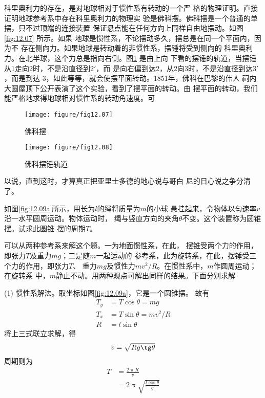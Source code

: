 \documentclass[../outline-of-mechanics.tex]{subfiles}
\begin{document}
科里奥利力的存在，是对地球相对于惯性系有转动的一个严
格的物理证明。直接证明地球参考系中存在科里奥利力的物理实
验是佛科摆。佛科摆是一个普通的单摆，只不过顶端的连接装置
保证悬点能在任何方向上同样自由地摆动。如图\ref{fig:12.07} 所示。如果
地球是惯性系，不论摆动多久，摆总是在同一个平面内，因为不
存在侧向力。如果地球是转动着的非惯性系，摆锤将受到侧向的
科里奥利力。在北半球，这个力总是指向右侧。图\ref{fig:12.08} 是由上向
下看的摆锤的轨道，当摆锤从1走向2时，不是沿直径到$ 2' $，而
是向右偏到达2，从2向3时，不是沿直径到达$ 3' $，而是到达
3，如此等等，就会使摆平面转动。1851年，佛科在巴黎的伟人
祠内大圆屋顶下公开表演了这个实验，看到了摆平面的转动。由
摆平面的转动，我们能严格地求得地球相对惯性系的转动角速度。可

\begin{figure}[h]
  \begin{minipage}[b]{0.5\linewidth}
    \centering
    \texttt{[image: figure/fig12.07]}
    \caption{佛科摆}
    \label{fig:12.07}
  \end{minipage}
  \begin{minipage}[b]{0.5\linewidth}
    \centering
    \texttt{[image: figure/fig12.08]}
    \caption{佛科摆锤轨道}
    \label{fig:12.08}
  \end{minipage}
\end{figure}%
\noindent
以说，直到这时，才算真正把亚里士多德的地心说与哥白
尼的日心说之争分清了。

\example 如图\ref{fig:12.09a}所示，用长为$ l $的绳将质量为$ m $的小球
悬挂起来，令物体以匀速率$ v $沿一水平圆周运动。物体运动时，
绳与竖直方向的夹角$ \theta $不变。这个装置称为圆锥摆。试求此圆锥
摆的周期$ T $。

\begin{figure}[h]
  \centering
  \qquad
  \caption{}
  \label{fig:12.09}
\end{figure}

\solution 可以从两种参考系来解这个题。一为地面惯性系，在此，
摆锥受两个力的作用，即张力$ T $及重力$ mg $；二是随$ m $一起运动的
参考系，此为旋转系，在此，摆锤受三个力的作用，即张力$ T $、
重力$ mg $及惯性力$ mv^2/R $。在惯性系中，$ m $作圆周运动；在旋转系
中，$ m $静止不动。用两种观点可解出同样的结果。下面分别求解

(1) 惯性系解法。取坐标如图\ref{fig:12.09a}，它是一个圆锥摆。
故有
\begin{align*}
  T _ { y } & = T \cos \theta = m g             \\
  T _ { x } & = T \sin \theta = m v ^ { 2 } / R \\
  R         & = l \sin \theta
\end{align*}
将上三式联立求解，得
\begin{equation*}
  v = \sqrt { R g \tg \theta }
\end{equation*}
周期则为
\begin{align*}
  T & = \frac { 2 \uppi R } { v }                     \\
    & = 2 \uppi \sqrt{ \frac { l \cos \theta } { g }}
\end{align*}
\end{document}
